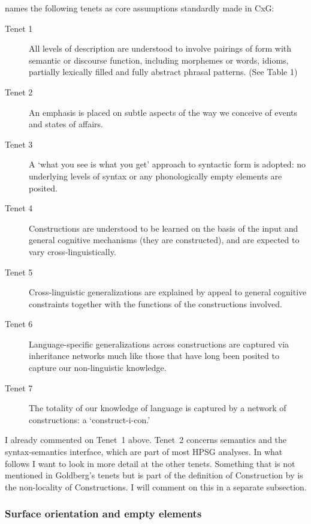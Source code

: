 \documentclass[output=paper]{langsci/langscibook}
\begin{document}
 \citet{Goldberg2003b} names the following tenets as core assumptions standardly made in CxG:
\begin{description}
\item[Tenet 1] All levels of description are understood to involve pairings of form with semantic or discourse function, including morphemes or words, idioms, partially lexically filled and fully abstract phrasal patterns. (See Table 1)
\item[Tenet 2] An emphasis is placed on subtle aspects of the way we conceive of events and states of
affairs.
\item[Tenet 3] A ‘what you see is what you get’ approach to syntactic form is adopted: no underlying levels
  of syntax or any phonologically empty elements are posited. 
\item[Tenet 4] Constructions are understood to be learned on the basis of the input and general cognitive mechanisms (they are constructed), and are expected to vary cross-linguistically.
\item[Tenet 5] Cross-linguistic generalizations are explained by appeal to general cognitive constraints together with the functions of the constructions involved.
\item[Tenet 6] Language-specific generalizations across constructions are captured via inheritance networks much like those that have long been posited to capture our non-linguistic knowledge.
\item[Tenet 7] The totality of our knowledge of language is captured by a network of constructions: a ‘construct-i-con.’
\end{description}

I already commented on Tenet~1 above. Tenet~2 concerns semantics and the syntax-semantics interface,
which are part of most HPSG analyses. In what follows I want to look in more detail at the other
tenets. Something that is not mentioned in Goldberg's tenets but is part of the definition of
Construction by \citep[]{FKoC88a} is the non-locality of Constructions. I will comment on
this in a separate subsection.

\subsubsection{Surface orientation and empty elements}
\end{document}
